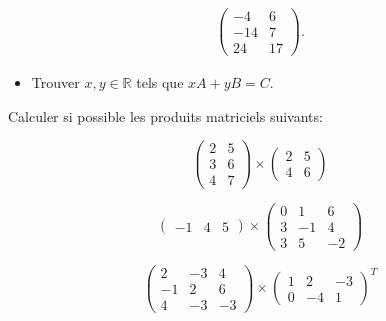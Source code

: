 \documentclass[12pt,a4paper]{book}
\begin{document}
\begin{multicols*}{2}
\begin{Exercice}
\[\begin{aligned}
		\begin{pmatrix}
		-4 & 6 \\
		-14 & 7 \\
		24 & 17 
		\end{pmatrix}.
		\end{aligned}
		\]
		\begin{itemize}
			\item Trouver $x, y\in\mathbb{R}$ tels que $xA+yB=C$.
		\end{itemize}
	\end{Exercice}  
	\begin{Exercice}
		Calculer si possible les produits matriciels suivants: 
		\begin{listexos}
			\item 
			\[ 
			\begin{pmatrix}
			2 & 5 \\
			3 & 6\\
			4 & 7 
			\end{pmatrix}
			\times
			\begin{pmatrix}
			2 & 5 \\
			4 & 6 
			
			\end{pmatrix}
			\]
			\item 
			\[ 
			\begin{pmatrix}
			-1 & 4 & 5
			\end{pmatrix}
			\times
			\begin{pmatrix}
			0 & 1 & 6\\
			3 & -1 & 4\\
			3 & 5 & -2
			\end{pmatrix}
			\]
			\item 
			\[ 
			\begin{pmatrix}
			2 & -3 & 4\\
			-1 & 2& 6\\
			4 & -3 & -3
			\end{pmatrix}
			\times
			\begin{pmatrix}
			1 & 2 & -3\\
			0 & -4 & 1
			\end{pmatrix}
			^T
			\]
		\end{listexos}
		
	\end{Exercice}  
	
\end{multicols*}
\end{document}
